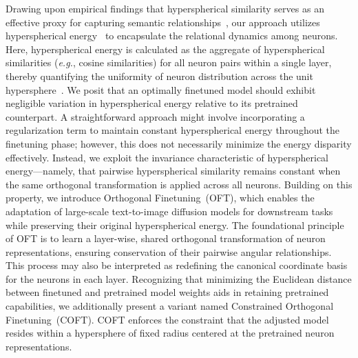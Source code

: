 Drawing upon empirical findings that hyperspherical similarity serves as an effective proxy for capturing semantic relationships~\cite{liu2017deep,liu2018decoupled,chen2020angular}, our approach utilizes hyperspherical energy~\cite{liu2018learning} to encapsulate the relational dynamics among neurons. Here, hyperspherical energy is calculated as the aggregate of hyperspherical similarities (\emph{e.g.}, cosine similarities) for all neuron pairs within a single layer, thereby quantifying the uniformity of neuron distribution across the unit hypersphere~\cite{liu2021learning}. We posit that an optimally finetuned model should exhibit negligible variation in hyperspherical energy relative to its pretrained counterpart. A straightforward approach might involve incorporating a regularization term to maintain constant hyperspherical energy throughout the finetuning phase; however, this does not necessarily minimize the energy disparity effectively. Instead, we exploit the invariance characteristic of hyperspherical energy—namely, that pairwise hyperspherical similarity remains constant when the same orthogonal transformation is applied across all neurons. Building on this property, we introduce Orthogonal Finetuning~(OFT), which enables the adaptation of large-scale text-to-image diffusion models for downstream tasks while preserving their original hyperspherical energy. The foundational principle of OFT is to learn a layer-wise, shared orthogonal transformation of neuron representations, ensuring conservation of their pairwise angular relationships. This process may also be interpreted as redefining the canonical coordinate basis for the neurons in each layer. Recognizing that minimizing the Euclidean distance between finetuned and pretrained model weights aids in retaining pretrained capabilities, we additionally present a variant named Constrained Orthogonal Finetuning~(COFT). COFT enforces the constraint that the adjusted model resides within a hypersphere of fixed radius centered at the pretrained neuron representations.

